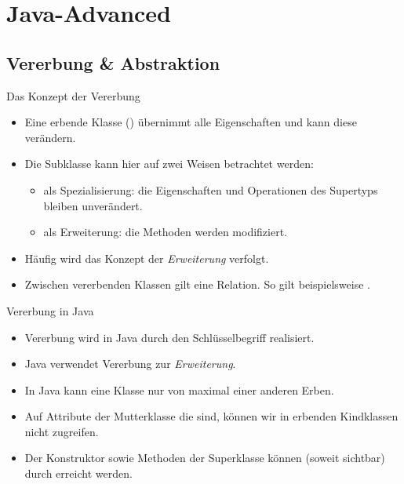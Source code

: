 \section{Java-Advanced}
\subsection{Vererbung \& Abstraktion}
\begin{frame}{Das Konzept der Vererbung}
    \hypertarget<1>{mrk:Vererbung}{}%
    \begin{itemize}[<+(1)->]
        \widei
        \item Eine erbende Klasse () übernimmt alle Eigenschaften und kann diese verändern.
        \item Die Subklasse kann hier auf zwei Weisen betrachtet werden: \begin{itemize}
            \item als Spezialisierung: die Eigenschaften und Operationen des Supertyps bleiben unverändert.
            \item als Erweiterung: die Methoden werden modifiziert.
        \end{itemize}
        \item Häufig wird das Konzept der \emph{Erweiterung} verfolgt.
        \item Zwischen vererbenden Klassen gilt eine  Relation.\pause{} So gilt beispielsweise .
    \end{itemize}
\end{frame}

\begin{frame}{Vererbung in Java}
    \begin{itemize}[<+(1)->]
        \widei
        \item Vererbung wird in Java durch den Schlüsselbegriff  realisiert.
        \item Java verwendet Vererbung zur \emph{Erweiterung}.
        \item In Java kann eine Klasse nur von maximal einer anderen Erben.
        \item Auf Attribute der Mutterklasse die  sind, können wir in erbenden Kindklassen nicht zugreifen.
        \item Der Konstruktor sowie Methoden der Superklasse können (soweit sichtbar) durch  erreicht werden.
    \end{itemize}
\end{frame}

